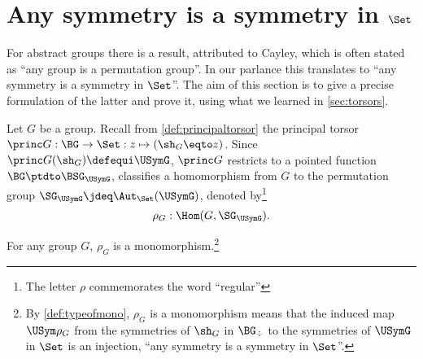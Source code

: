 \section{Any symmetry is a symmetry in $\Set$}
\label{sec:groupssubperm}


For abstract groups there is a result, attributed to Cayley,
which is often stated as ``any group is a permutation group''. 
In our parlance this translates to ``any symmetry is a symmetry in $\Set$''.
The aim of this section is to give a precise formulation of the latter
and prove it, using what we learned in \cref{sec:torsors}.

Let $G$ be a group.
Recall from \cref{def:principaltorsor} the principal torsor
$\princ G:\BG\to\Set: z\mapsto (\sh_G\eqto z)$.
Since $\princ G (\sh_G)\defequi \USymG$, $\princ G$ restricts to
a pointed function $\BG\ptdto \BSG_{\USymG}$, \ie 
classifies a homomorphism from $G$ to the permutation group 
$\SG_{\USymG}\jdeq \Aut_{\Set}(\USymG)$,
denoted by\footnote{The letter $\rho$ commemorates the word ``regular''} 
$$\rho_G:\Hom(G,\SG_{\USymG}).$$

\begin{theorem}[Cayley]
  \label{lem:allgpsarepermutationgps}
  For any group $G$, $\rho_G$ is a monomorphism.\footnote{By
  \cref{def:typeofmono}, $\rho_G$ is a monomorphism means 
  that the induced map $\USym\rho_G$ from the symmetries of $\sh_G$ in 
  $\BG_\div$ to the symmetries of $\USymG$ in $\Set$ is an injection, 
  \ie ``any symmetry is a symmetry in $\Set$''.}  
\end{theorem}

